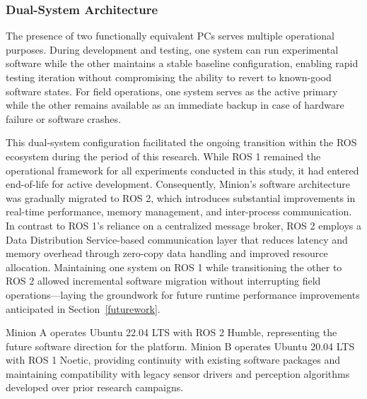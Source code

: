 \subsubsection{Dual-System Architecture}

The presence of two functionally equivalent PCs serves multiple operational purposes.
During development and testing, one system can run experimental software while the other maintains a stable baseline configuration, enabling rapid testing iteration without compromising the ability to revert to known-good software states.
For field operations, one system serves as the active primary while the other remains available as an immediate backup in case of hardware failure or software crashes.

This dual-system configuration facilitated the ongoing transition within the \ac{ROS} ecosystem during the period of this research.
While \ac{ROS} 1 remained the operational framework for all experiments conducted in this study, it had entered end-of-life for active development.
Consequently, Minion’s software architecture was gradually migrated to \ac{ROS} 2, which introduces substantial improvements in real-time performance, memory management, and inter-process communication.
In contrast to ROS 1’s reliance on a centralized message broker, ROS 2 employs a Data Distribution Service-based communication layer that reduces latency and memory overhead through zero-copy data handling and improved resource allocation.
Maintaining one system on ROS 1 while transitioning the other to ROS 2 allowed incremental software migration without interrupting field operations—laying the groundwork for future runtime performance improvements anticipated in Section~\ref{futurework}.

Minion A operates Ubuntu 22.04 LTS with ROS 2 Humble, representing the future software direction for the platform.
Minion B operates Ubuntu 20.04 LTS with ROS 1 Noetic, providing continuity with existing software packages and maintaining compatibility with legacy sensor drivers and perception algorithms developed over prior research campaigns.


